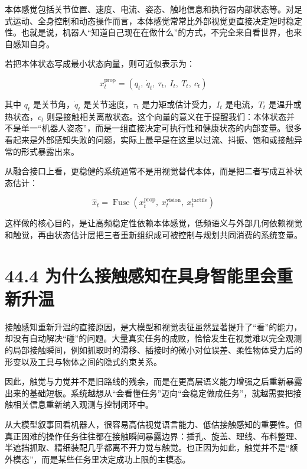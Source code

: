 本体感觉包括关节位置、速度、电流、姿态、触地信息和执行器内部状态等。对足式运动、全身控制和动态操作而言，本体感觉常常比外部视觉更直接决定短时稳定性。也就是说，机器人“知道自己现在在做什么”的方式，不完全来自看世界，也来自感知自身。

若把本体状态写成最小状态向量，则可近似表示为：

\begingroup
\footnotesize
\begin{equation*}
x_t^{\text{prop}} = (q_t,\ \dot q_t,\ \tau_t,\ I_t,\ T_t,\ c_t)
\end{equation*}
\endgroup

其中 \(q_t\) 是关节角，\(\dot q_t\) 是关节速度，\(\tau_t\) 是力矩或估计受力，\(I_t\) 是电流，\(T_t\) 是温升或热状态，\(c_t\) 则是接触相关离散状态。这个向量的意义在于提醒我们：本体状态并不是单一“机器人姿态”，而是一组直接决定可执行性和健康状态的内部变量。很多看起来是外部感知失败的问题，实际上最早是在这里以过流、抖振、饱和或接触异常的形式暴露出来。

从融合接口上看，更稳健的系统通常不是用视觉替代本体，而是把二者写成互补状态估计：

\begingroup
\scriptsize
\begin{equation*}
\hat x_t = \operatorname{Fuse}(x_t^{\text{prop}},\ x_t^{\text{vision}},\ x_t^{\text{tactile}})
\end{equation*}
\endgroup

这样做的核心目的，是让高频稳定性依赖本体感觉，低频语义与外部几何依赖视觉和触觉，再由状态估计层把三者重新组织成可被控制与规划共同消费的系统变量。

\section*{44.4 为什么接触感知在具身智能里会重新升温}


接触感知重新升温的直接原因，是大模型和视觉表征虽然显著提升了“看”的能力，却没有自动解决“碰”的问题。大量真实任务的成败，恰恰发生在视觉难以完全观测的局部接触瞬间，例如抓取时的滑移、插接时的微小对位误差、柔性物体受力后的形变以及工具与物体之间的隐式约束关系。

因此，触觉与力觉并不是旧路线的残余，而是在更高层语义能力增强之后重新暴露出来的基础短板。系统越想从“会看懂任务”迈向“会稳定做成任务”，就越需要把接触相关信息重新纳入观测与控制闭环中。

从大模型叙事回看机器人，很容易高估视觉语言能力、低估接触感知的重要性。但真正困难的操作任务往往都在接触瞬间暴露边界：插孔、旋盖、理线、布料整理、半遮挡抓取、精细装配几乎都离不开力觉与触觉。也正因为如此，触觉并不是“额外模态”，而是某些任务里决定成功上限的主模态。

